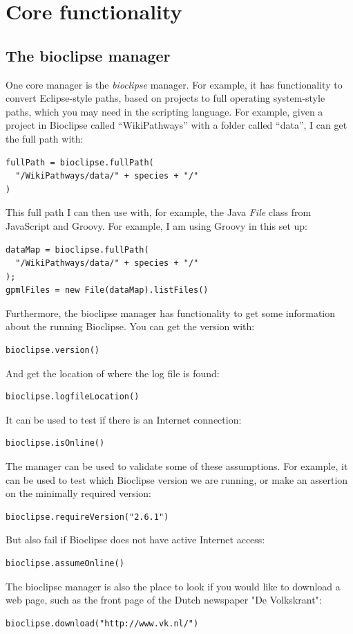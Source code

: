 \documentclass[a5paper, 10pt]{memoir}
\begin{document}
\chapter{Core functionality}
\begin{refsection}

\section{The bioclipse manager}

One core manager is the \emph{bioclipse} manager. For example, it has
functionality to convert Eclipse-style paths, based on projects to full
operating system-style paths, which you may need in the scripting language. For
example, given a project in Bioclipse called ``WikiPathways'' with a folder
called ``data'', I can get the full path with:
\begin{Verbatim}
fullPath = bioclipse.fullPath(
  "/WikiPathways/data/" + species + "/"
)
\end{Verbatim}
This full path I can then use with, for example, the Java
\emph{File} class from JavaScript and Groovy. For example,
I am using Groovy in this set up:
\begin{Verbatim}
dataMap = bioclipse.fullPath(
  "/WikiPathways/data/" + species + "/"
);
gpmlFiles = new File(dataMap).listFiles()
\end{Verbatim}
Furthermore, the bioclipse manager has functionality to get some information
about the running Bioclipse. You can get the version with:
\begin{Verbatim}
bioclipse.version()
\end{Verbatim}
And get the location of where the log file is
found:
\begin{Verbatim}
bioclipse.logfileLocation()
\end{Verbatim}
It can be used to test if there is an Internet
connection:
\begin{Verbatim}
bioclipse.isOnline()
\end{Verbatim}
The manager can be used to validate some of these assumptions. For example, it
can be used to test which Bioclipse version we are running, or make an
assertion on the minimally required version:
\begin{Verbatim}
bioclipse.requireVersion("2.6.1")
\end{Verbatim}
But also fail if Bioclipse does not have active Internet
access:
\begin{Verbatim}
bioclipse.assumeOnline()
\end{Verbatim}
The bioclipse manager is also the place to look if you would like to download a
web page, such as the front page of the Dutch newspaper "De
Volkskrant":
\begin{Verbatim}
bioclipse.download("http://www.vk.nl/")
\end{Verbatim}



\end{refsection}
\end{document}

